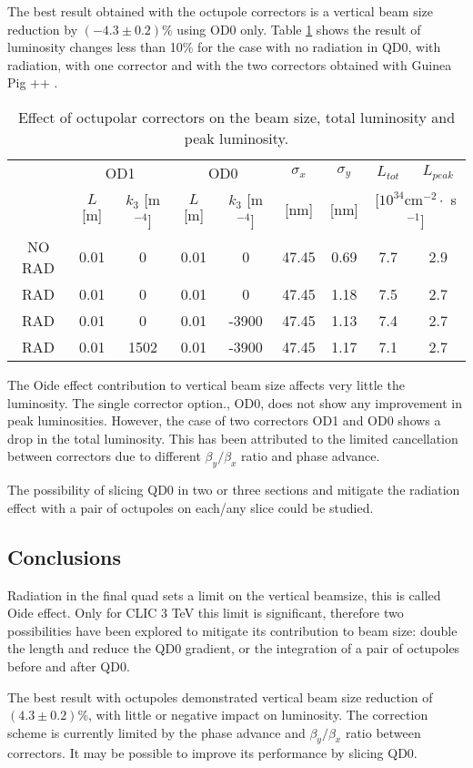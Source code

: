 The best result obtained with the octupole correctors is a vertical beam size reduction by $(-4.3\pm0.2)$\% using OD0 only. Table \ref{t:correctors} shows the result of luminosity changes less than 10\% for the case with no radiation in QD0, with radiation, with one corrector and with the two correctors obtained with Guinea Pig ++ \cite{Schulte:382453}.\par
\begin{table}[!hbt]
\centering
\scriptsize
\begin{tabular}{c||c|c|c|c||c|c||c|c}\hline
& \multicolumn{2}{c|}{OD1} &\multicolumn{2}{c||}{OD0} & $\sigma_x$ & $\sigma_y$ & $L_{tot}$ & $L_{peak}$\\
& $L$ [m] & $k_3$ [m$^{-4}$] & $L$ [m] & $k_3$ [m$^{-4}$] &  [nm] & [nm] & \multicolumn{2}{c}{[$10^{34}$cm$^{-2}\cdot$ s$^{-1}$]}\\\hline\hline
NO RAD & 0.01 & 0 & 0.01 & 0 & 47.45 & 0.69 & 7.7 & 2.9\\
RAD    & 0.01 & 0 & 0.01 & 0 & 47.45 & 1.18 & 7.5 & 2.7 \\
RAD    & 0.01 & 0 & 0.01 & -3900 & 47.45 & 1.13 & 7.4 & 2.7 \\
RAD    & 0.01 & 1502 & 0.01 & -3900 & 47.45 & 1.17 & 7.1 & 2.7 \\\hline
\end{tabular}\caption{Effect of octupolar correctors on the beam size, total luminosity and peak luminosity.}\label{t:correctors}
\end{table}
The Oide effect contribution to vertical beam size affects very little the luminosity. The single corrector option., OD0, does not show any improvement in peak luminosities. However, the case of two correctors OD1 and OD0 shows a drop in the total luminosity. This has been attributed to the limited cancellation between correctors due to different $\beta_y/\beta_x$ ratio and phase advance.\par
The possibility of slicing QD0 in two or three sections and mitigate the radiation effect with a pair of octupoles on each/any slice could be studied.\par
\subsection{Conclusions}
Radiation in the final quad sets a limit on the vertical beamsize, this is called Oide effect. Only for CLIC 3 TeV this limit is significant, therefore two possibilities have been explored to mitigate its contribution to beam size: double the length and reduce the QD0 gradient, or the integration of a pair of octupoles before and after QD0.\par
The best result with octupoles demonstrated vertical beam size reduction of $(4.3\pm0.2)$\%, with little or negative impact on luminosity. The correction scheme is currently limited by the phase advance and $\beta_y/\beta_x$ ratio between correctors. It may be possible to improve its performance by slicing QD0.\par
